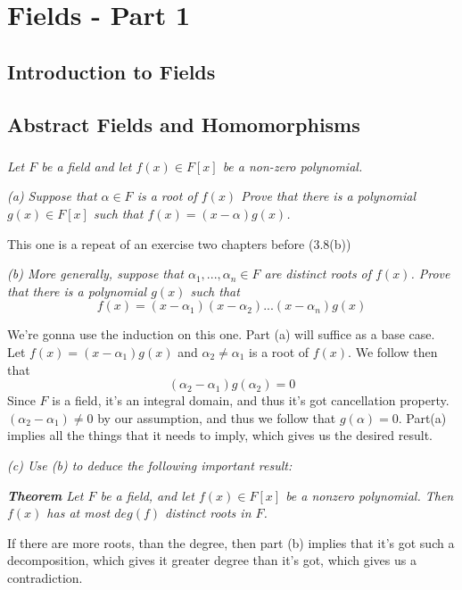 \documentclass[11pt,oneside,titlepage]{book}
\begin{document}
\chapter{Fields - Part 1} 

\section{Introduction to Fields}

\section{Abstract Fields and Homomorphisms}

\subsection{}

\textit{Let $F$ be a field and let $f(x) \in F[x]$ be a non-zero polynomial.}

\textit{(a) Suppose that $\alpha \in F$ is a root of $f(x)$ Prove that
there is a polynomial $g(x) \in F[x]$ such that $f(x) = (x - \alpha)
g(x)$.}

This one is a repeat of an exercise two chapters before (3.8(b))

\textit{(b) More generally, suppose that $\alpha_1, ..., \alpha_n \in
F$ are distinct roots of $f(x)$. Prove that there is a polynomial
$g(x)$ such that
  $$f(x) = (x - \alpha_1) (x - \alpha_2) ... (x - \alpha_n) g(x)$$
}

We're gonna use the induction on this one. Part (a) will suffice as a
base case. Let $f(x) = (x - \alpha_1) g(x)$ and $\alpha_2 \neq
\alpha_1$ is a root of $f(x)$. We follow then that
$$(\alpha_2 - \alpha_1) g(\alpha_2) = 0$$
Since $F$ is a field, it's an integral domain, and thus it's got
cancellation property.  $(\alpha_2 - \alpha_1) \neq 0$ by our
assumption, and thus we follow that $g(\alpha) = 0$.  Part(a) implies
all the things that it needs to imply, which gives us the desired
result.

\textit{(c) Use (b) to deduce the following important result:}

\textit{\textbf{Theorem} Let $F$ be a field, and let $f(x) \in F[x]$
be a nonzero polynomial.  Then $f(x)$ has at most $deg(f)$ distinct
roots in $F$.}

If there are more roots, than the degree, then part (b) implies that
it's got such a decomposition, which gives it greater degree than it's
got, which gives us a contradiction.
\end{document}
